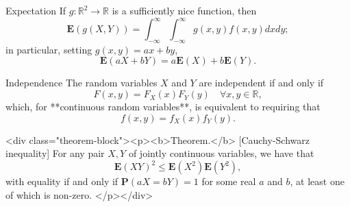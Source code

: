 \begin{newnotion}{Expectation}
If $g: \mathbb{R}^2 \to \mathbb{R}$ is a sufficiently nice function, then 
$$\begin{equation}
    \mathbf{E}(g(X, Y))=\int_{-\infty}^{\infty} \int_{-\infty}^{\infty} g(x, y) f(x, y) d x d y;
\end{equation}$$
in particular, setting $g(x, y) = ax + by$, 
$$\begin{equation}
    \mathbf{E}(aX+bY) = a\mathbf{E}(X) + b\mathbf{E}(Y).
\end{equation}$$
\end{newnotion}

\begin{newnotion}{Independence}
The random variables $X$ and $Y$ are independent if and only if 
$$\begin{equation}
    F(x,y) = F_X(x) F_Y(y) \quad \forall x, y \in \mathbb{R},
\end{equation}$$
which, for **continuous random variables**, is equivalent to requiring that 
$$\begin{equation}
    f(x,y) = f_X(x) f_Y(y).
\end{equation}$$
\end{newnotion}
 
<div class="theorem-block"><p><b>Theorem.</b> [Cauchy-Schwarz inequality] For any pair $X, Y$ of jointly continuous variables, we have that 
$$\begin{equation}
    \mathbf{E}(XY)^2 \leq \mathbf{E}(X^2) \mathbf{E}(Y^2), 
\end{equation}$$
with equality if and only if $\mathbf{P}(aX = bY) = 1$ for some real $a$ and $b$, at least one of which is non-zero. 
</p></div>


